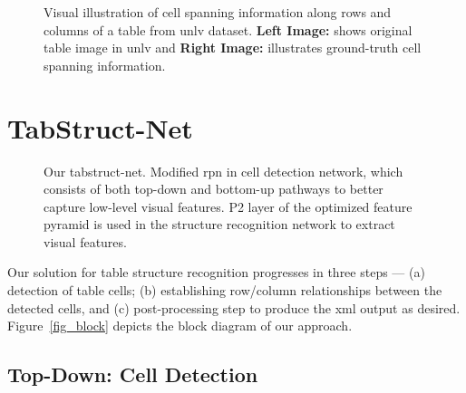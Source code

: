 \documentclass[runningheads]{llncs}
\begin{document}
\begin{figure*}[t]
\begin{center}
\end{center}
\caption{Visual illustration of cell spanning information along rows and columns of a table from {\sc unlv} dataset. \textbf{Left Image:} shows original table image in {\sc unlv} and \textbf{Right Image:} illustrates ground-truth cell spanning information. } \label{fig_ts}
\end{figure*}

\section{TabStruct-Net}\label{proposed_approach}

\begin{figure*}[t]
\begin{center}
\end{center}
\caption{Our {\sc t}ab{\sc s}truct-{\sc n}et. Modified {\sc rpn} in cell detection network, which consists of both top-down and bottom-up pathways to better capture low-level visual features. P2 layer of the optimized feature pyramid is used in the structure recognition network to extract visual features.}\label{fig_gnn}
\end{figure*}

Our solution for table structure recognition progresses in three steps --- (a) detection of table cells; (b) establishing row/column relationships between the detected cells, and (c) post-processing step to produce the {\sc xml} output as desired. Figure~\ref{fig_block} depicts the block diagram of our approach. 

\subsection{Top-Down: Cell Detection}
\end{document}
